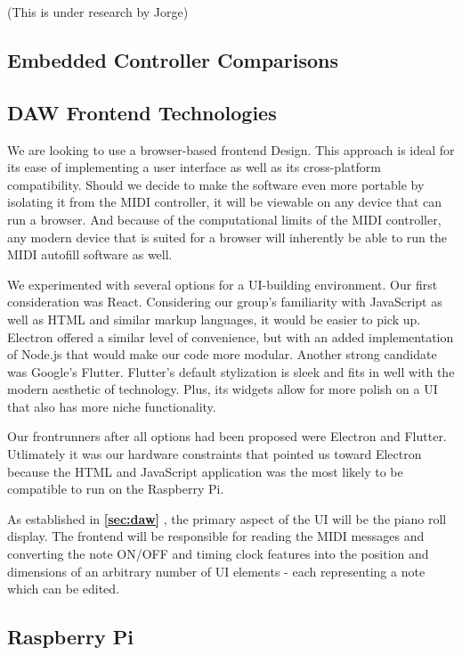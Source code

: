 (This is under research by Jorge)


\subsection{Embedded Controller Comparisons}
\label{sec:embedded_controllers}

\blindtext

\subsection{DAW Frontend Technologies}

We are looking to use a browser-based frontend Design. This approach is ideal for its ease
of implementing a user interface as well as its cross-platform compatibility. Should we
decide to make the software even more portable by isolating it from the MIDI controller,
it will be viewable on any device that can run a browser. And because of the computational
limits of the MIDI controller, any modern device that is suited for a browser will
inherently be able to run the MIDI autofill software as well.

We experimented with several options for a UI-building environment. Our first consideration was
React. Considering our group's familiarity with JavaScript as well as HTML and similar markup
languages, it would be easier to pick up. Electron offered a similar level of convenience, but with
an added implementation of Node.js that would make our code more modular. Another strong candidate
was Google's Flutter. Flutter's default stylization is sleek and fits in well with the modern
aesthetic of technology. Plus, its widgets allow for more polish on a UI that also has more niche
functionality.

Our frontrunners after all options had been proposed were Electron and Flutter. Utlimately it was
our hardware constraints that pointed us toward Electron because the HTML and JavaScript
application was the most likely to be compatible to run on the Raspberry Pi.

As established in \textbf{\ref{sec:daw} }, the primary aspect of the UI
will be the piano roll display. The frontend will be responsible for reading the MIDI
messages and converting the note ON/OFF and timing clock features into the position and
dimensions of an arbitrary number of UI elements - each representing a note which can be
edited.

\subsection{Raspberry Pi}

